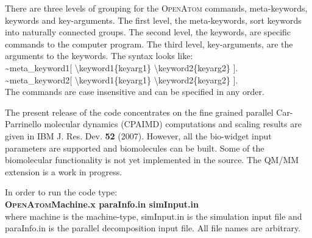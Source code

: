 \documentclass[12pt,titlepage]{article}
\begin{document}
There are three levels of grouping for the \textsc{OpenAtom} commands, 
meta-keywords, keywords and key-arguments.
The first level, the meta-keywords, sort keywords into naturally
connected groups. The second level, the keywords, are specific
commands to the computer program. The third level, key-arguments,
are the arguments to the keywords.  The syntax looks like: \\ 
\hspace*{0.5in} \~{}meta\_keyword1[ \textbackslash keyword1\{keyarg1\}
\textbackslash keyword2\{keyarg2\} ]. \\
\hspace*{0.5in} \~{}meta\_keyword2[ \textbackslash keyword1\{keyarg1\}
\textbackslash keyword2\{keyarg2\} ]. \\
The commands are case insensitive and can be specified in any order.

The present release of the code concentrates on the fine grained
parallel Car-Parrinello molecular dynamics (CPAIMD) computations 
and scaling results are given in IBM J. Res. Dev. {\bf 52} (2007). 
However, all the 
bio-widget input parameters are supported and biomolecules can be
built. Some of the biomolecular functionality is not yet implemented
in the source. The QM/MM extension is a work in progress.

In order to run the code type: \\
\hspace*{1.5in} {\bf \textsc{OpenAtom}Machine.x paraInfo.in simInput.in} \\
where machine is the machine-type, simInput.in is the simulation input
file and paraInfo.in is the parallel decomposition input file. 
All file names are arbitrary.
\end{document}
